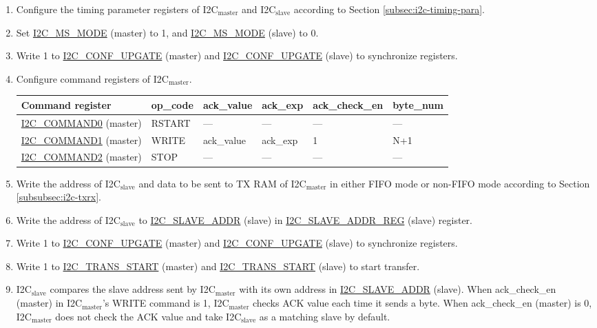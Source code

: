 \documentclass[main\_\_EN.tex]{subfiles}
\begin{document}
\begin{enumerate}
\item Configure the timing parameter registers of I2C$_\text{master}$ and I2C$_\text{slave}$ according to Section \ref{subsec:i2c-timing-para}.
\item Set \hyperref[fielddesc:I2CMSMODE]{I2C\_MS\_MODE} (master) to 1, and \hyperref[fielddesc:I2CMSMODE]{I2C\_MS\_MODE} (slave) to 0.
\item Write 1 to \hyperref[fielddesc:I2CCONFUPGATE]{I2C\_CONF\_UPGATE} (master) and \hyperref[fielddesc:I2CCONFUPGATE]{I2C\_CONF\_UPGATE} (slave) to synchronize registers.
\item Configure command registers of I2C$_\text{master}$.

\begin{longtable}{ | p{5cm} | p{1.5cm} | p{1.5cm} | p{1.5cm} |p{2.5cm} | p{1.5cm} |}
\hline\rowcolor{lightgray}
Command register& op\_code & ack\_value&ack\_exp&ack\_check\_en&byte\_num  \\ \hline
\hyperref[fielddesc:I2CCOMMAND0]{I2C\_COMMAND0} (master)& RSTART& ---&---&---&---  \\ \hline
\hyperref[fielddesc:I2CCOMMAND1]{I2C\_COMMAND1} (master)& WRITE& ack\_value&ack\_exp&1&N+1  \\ \hline
\hyperref[fielddesc:I2CCOMMAND2]{I2C\_COMMAND2} (master)& STOP& ---&---&---&---  \\ \hline
\end{longtable}

\item Write the address of I2C$_\text{slave}$ and data to be sent to TX RAM of I2C$_\text{master}$ in either FIFO mode or non-FIFO mode according to Section \ref{subsubsec:i2c-txrx}.
\item Write the address of I2C$_\text{slave}$ to \hyperref[fielddesc:I2CSLAVEADDR]{I2C\_SLAVE\_ADDR} (slave) in \hyperref[regdesc:I2CSLAVEADDRREG]{I2C\_SLAVE\_ADDR\_REG} (slave) register.
\item Write 1 to \hyperref[fielddesc:I2CCONFUPGATE]{I2C\_CONF\_UPGATE} (master) and \hyperref[fielddesc:I2CCONFUPGATE]{I2C\_CONF\_UPGATE} (slave) to synchronize registers.
\item Write 1 to \hyperref[fielddesc:I2CTRANSSTART]{I2C\_TRANS\_START} (master) and \hyperref[fielddesc:I2CTRANSSTART]{I2C\_TRANS\_START} (slave) to start transfer.
\item I2C$_\text{slave}$ compares the slave address sent by I2C$_\text{master}$ with its own address in \hyperref[fielddesc:I2CSLAVEADDR]{I2C\_SLAVE\_ADDR} (slave). When ack\_check\_en (master) in I2C$_\text{master}$'s WRITE command is 1, I2C$_\text{master}$ checks ACK value each time it sends a byte. When ack\_check\_en (master) is 0, I2C$_\text{master}$ does not check the ACK value and take I2C$_\text{slave}$ as a matching slave by default.


\end{enumerate}
\end{document}
